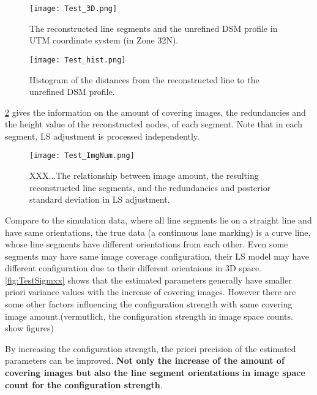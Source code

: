 \begin{figure}
  \centering
  \texttt{[image: Test\_3D.png]}
  \caption{\small The reconstructed line segments and the unrefined DSM profile in UTM coordinate system (in Zone 32N).}
  \label{fig:Test3D}
  \vspace{1cm}
  \texttt{[image: Test\_hist.png]}
  \caption{\small Histogram of the distances from the reconstructed line to the unrefined DSM profile.}
  \label{fig:TestHist}
\end{figure}

\clearpage

\cref{fig:TestImgNum} gives the information on the amount of covering images, the redundancies and the height value of the reconstructed nodes, of each segment. Note that in each segment, LS adjustment is processed independently.

\begin{figure}
  \centering
  \texttt{[image: Test\_ImgNum.png]}
  \caption{\small XXX...The relationship between image amount, the resulting reconstructed line segments, and the redundancies and posterior standard deviation in LS adjustment.}
  \label{fig:TestImgNum}
\end{figure}




Compare to the simulation data, where all line segments lie on a straight line and have same orientations, the true data (a continuous lane marking) is a curve line, whose line segments have different orientations from each other. Even some segments may have same image coverage configuration, their LS model may have different configuration due to their different orientaions in 3D space. \cref{fig:TestSigmxx} shows that the estimated parameters generally have smaller priori variance values with the increase of covering images. However there are some other factors influencing the configuration strength with same covering image amount.(vermutlich, the configuration strength in image space counts. show figures)

By increasing the configuration strength, the priori precision of the estimated parameters can be improved. \textbf{Not only the increase of the amount of covering images but also the line segment orientations in image space count for the configuration strength}.


